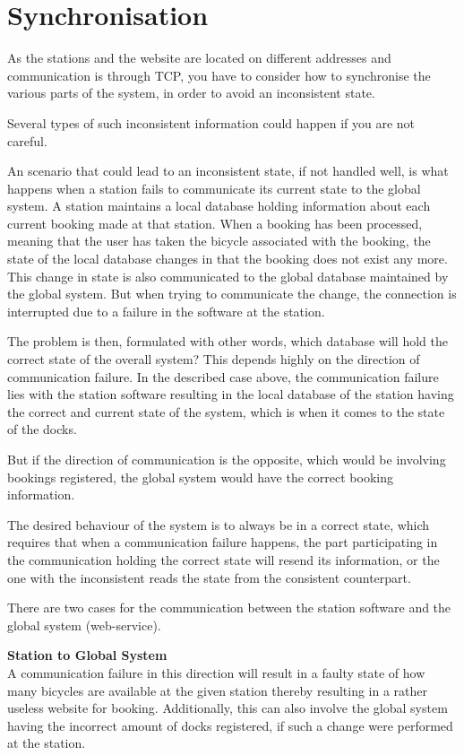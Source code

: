 \section{Synchronisation}\label{sec:sync}
As the stations and the website are located on different addresses and communication is through TCP, you have to consider how to synchronise the various parts of the system, in order to avoid an inconsistent state.

Several types of such inconsistent information could happen if you are not careful.

An scenario that could lead to an inconsistent state, if not handled well, is what happens when a station fails to communicate its current state to the global system.
A station maintains a local database holding information about each current booking made at that station.
When a booking has been processed, meaning that the user has taken the bicycle associated with the booking, the state of the local database changes in that the booking does not exist any more.
This change in state is also communicated to the global database maintained by the global system.
But when trying to communicate the change, the connection is interrupted due to a failure in the software at the station.

The problem is then, formulated with other words, which database will hold the correct state of the overall system?
This depends highly on the direction of communication failure. 
In the described case above, the communication failure lies with the station software resulting in the local database of the station having the correct and current state of the system, which is when it comes to the state of the docks.


But if the direction of communication is the opposite, which would be involving bookings registered, the global system would have the correct booking information.

The desired behaviour of the system is to always be in a correct state, which requires that when a communication failure happens, the part participating in the communication holding the correct state will resend its information, or the one with the inconsistent reads the state from the consistent counterpart.

There are two cases for the communication between the station software and the global system (web-service).

\textbf{Station to Global System}\\
A communication failure in this direction will result in a faulty state of how many bicycles are available at the given station thereby resulting in a rather useless website for booking.
Additionally, this can also involve the global system having the incorrect amount of docks registered, if such a change were performed at the station.

